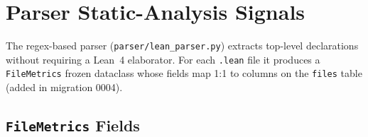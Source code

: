 
\section{Parser Static-Analysis Signals}
\label{sec:parser-signals}

The regex-based parser (\texttt{parser/lean\_parser.py}) extracts top-level
declarations without requiring a Lean~4 elaborator.  For each \texttt{.lean}
file it produces a \texttt{FileMetrics} frozen dataclass whose fields map 1:1
to columns on the \texttt{files} table (added in migration 0004).

\subsection{\texttt{FileMetrics} Fields}

